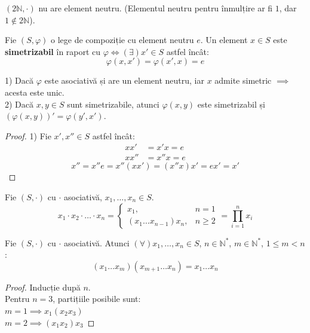 \begin{example}
$(2\mathbb{N}, \cdot)$ nu are element neutru. (Elementul neutru pentru înmulțire ar fi $1$, dar $1 \notin 2\mathbb{N}$).
\end{example}

\begin{definition}
Fie $(S, \varphi)$ o lege de compoziție cu element neutru $e$. Un element $x \in S$ este \textbf{simetrizabil} în raport cu $\varphi \iff (\exists) x' \in S$ astfel încât:
$$ \varphi(x, x') = \varphi(x', x) = e $$
\end{definition}

\begin{proposition}
1) Dacă $\varphi$ este asociativă și are un element neutru, iar $x$ admite simetric $\implies$ acesta este unic. \\
2) Dacă $x, y \in S$ sunt simetrizabile, atunci $\varphi(x, y)$ este simetrizabil și $(\varphi(x, y))' = \varphi(y', x')$.
\end{proposition}

\begin{proof}
1) Fie $x', x'' \in S$ astfel încât:
\begin{align*}
    x x' &= x' x = e \\
    x x'' &= x'' x = e
\end{align*}
$$ x'' = x'' e = x'' (x x') = (x'' x) x' = e x' = x' $$
\end{proof}


\begin{definition}
Fie $(S, \cdot)$ cu $\cdot$ asociativă, $x_1, \dots, x_n \in S$.
$$ x_1 \cdot x_2 \cdot \dots \cdot x_n = \begin{cases} x_1, & n=1 \\ (x_1 \dots x_{n-1})x_n, & n \ge 2 \end{cases} = \prod_{i=1}^n x_i $$
\end{definition}

\begin{lemma}
Fie $(S, \cdot)$ cu $\cdot$ asociativă. Atunci $(\forall) x_1, \dots, x_n \in S$, $n \in \mathbb{N}^*$, $m \in \mathbb{N}^*$, $1 \le m < n$:
$$ (x_1 \dots x_m)(x_{m+1} \dots x_n) = x_1 \dots x_n $$
\end{lemma}

\begin{proof}
Inducție după $n$. \\
Pentru $n=3$, partițiile posibile sunt: \\
$m=1 \implies x_1(x_2 x_3)$ \\
$m=2 \implies (x_1 x_2)x_3$
\end{proof}

